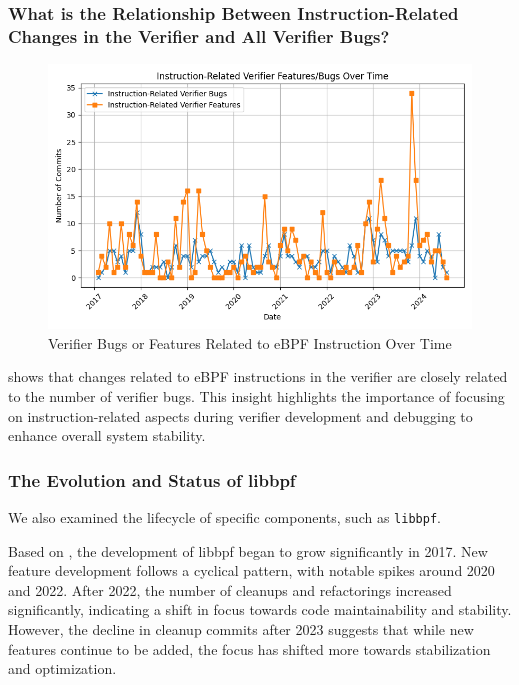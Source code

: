 \subsubsection{What is the Relationship Between Instruction-Related Changes in the Verifier and All Verifier Bugs?}

\begin{figure}[ht]
    \centering
    \includegraphics[width=\linewidth]{feature-analysis/instruction_verifier_features_bugs_over_time.png}
    \caption{Verifier Bugs or Features Related to eBPF Instruction Over Time}
    \label{fig:instruction_verifier_features_bugs_over_time}
\end{figure}

 shows that changes related to eBPF instructions in the verifier are closely related to the number of verifier bugs. This insight highlights the importance of focusing on instruction-related aspects during verifier development and debugging to enhance overall system stability.

\subsubsection{The Evolution and Status of libbpf}

We also examined the lifecycle of specific components, such as \texttt{libbpf}.

Based on , the development of libbpf began to grow significantly in 2017. New feature development follows a cyclical pattern, with notable spikes around 2020 and 2022. After 2022, the number of cleanups and refactorings increased significantly, indicating a shift in focus towards code maintainability and stability. However, the decline in cleanup commits after 2023 suggests that while new features continue to be added, the focus has shifted more towards stabilization and optimization.

